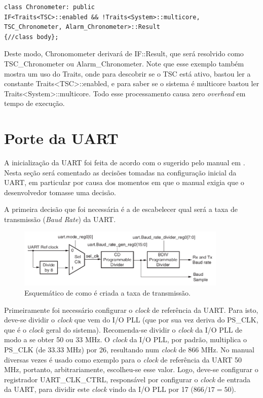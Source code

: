 \documentclass{ufscThesis/ufscThesis} %
\begin{document}
\begin{verbatim}
class Chronometer: public
IF<Traits<TSC>::enabled && !Traits<System>::multicore,
TSC_Chronometer, Alarm_Chronometer>::Result
{//class body};
\end{verbatim}

Deste modo, Chronomometer derivará de IF::Result, que será resolvido como TSC\_Chronometer ou Alarm\_Chronometer. Note que esse exemplo também mostra um uso do Traits, onde para descobrir se o TSC está ativo, bastou ler a constante Traits<TSC>::enabled, e para saber se o sistema é multicore bastou ler Traits<System>::multicore. Todo esse processamento causa zero \emph{overhead} em tempo de execução.

\section{Porte da UART}

A inicialização da UART foi feita de acordo com o sugerido pelo manual em \cite[p.~554]{ug585}. Nesta seção será comentado as decisões tomadas na configuração inicial da UART, em particular por causa dos momentos em que o manual exigia que o desenvolvedor tomasse uma decisão.

A primeira decisão que foi necessária é a de escabelecer qual será a taxa de transmissão (\emph{Baud Rate}) da UART. 

\begin{figure}[ht!]
    \centering
    \includegraphics[width=10cm]{figuras/uart_board_rate}
    \caption{Esquemático de como é criada a taxa de transmissão.}
	\label{fig:uart}
\end{figure}

Primeiramente foi necessário configurar o \emph{clock} de referência da UART. Para isto, deve-se dividir o \emph{clock} que vem do I/O PLL (que por sua vez deriva do PS\_CLK, que é o \emph{clock} geral do sistema). Recomenda-se dividir o \emph{clock} da I/O PLL de modo a se obter 50 ou 33 MHz.
O \emph{clock} da I/O PLL, por padrão, multiplica o PS\_CLK (de 33.33 MHz) por 26, resultando num \emph{clock} de 866 MHz.
No manual diversas vezes é usado como exemplo para o \emph{clock} de referência da UART 50 MHz, portanto, arbitrariamente, escolheu-se esse valor. Logo, deve-se configurar o registrador UART\_CLK\_CTRL, responsável por configurar o \emph{clock} de entrada da UART, para dividir este \emph{clock} vindo da I/O PLL por 17 ($866/17 = 50$).
\end{document}
